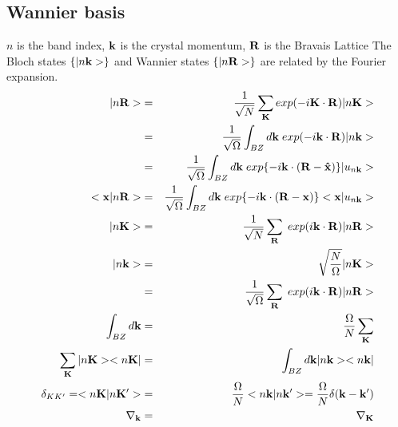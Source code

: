 \documentclass[aps,prb,preprint]{revtex4-1}
\begin{document}
\begin{appendix}

\section{Wannier basis}
$n$ is the band index, $\bf k$ is the crystal momentum, ${\bf R} $ is the Bravais Lattice
The Bloch states $\{ |n{\bf k}> \}$ and Wannier states $\{ |n{\bf R}> \}$ are related by the Fourier expansion. 
\begin{eqnarray}
|n{\bf R}> &=&\frac{1}{\sqrt{N}} \sum_{\bf K} exp(-i{\bf K} \cdot {\bf R})|n{\bf K}> \nonumber\\
&=&\frac{1}{\sqrt{\Omega}} \int_{BZ} d{\bf k} \; exp(-i{\bf k} \cdot {\bf R})|n{\bf k}> \nonumber\\
&=&\frac{1}{\sqrt{\Omega}} \int_{BZ} d{\bf k} \; exp\{-i{\bf k} \cdot ({\bf R- \hat{x}})\}|u_{n{\bf k}}>\\
<{\bf x}|n{\bf R}>&=& \frac{1}{\sqrt{\Omega}} \int_{BZ} d{\bf k} \; exp\{-i{\bf k} \cdot ({\bf R- x})\}<{\bf x}|u_{n{\bf k}}> \\
|n{\bf K}>&=& \frac{1}{\sqrt{N}} \sum_{\bf R} \; exp(i{\bf k} \cdot {\bf R}) |n{\bf R}> \\
|n{\bf k}>&=&  \sqrt{\frac{N}{\Omega}} |n{\bf K}> \nonumber \\
&=& \frac{1}{\sqrt{\Omega}} \sum_{\bf R} \; exp(i{\bf k} \cdot {\bf R}) |n{\bf R}> \\
 \int_{BZ} d{\bf k} &=& \frac{\Omega}{N} \sum_{\bf K}\\
\sum_{\bf K} |n{\bf K}><n{\bf K}| &=& \int_{BZ} d{\bf k} |n{\bf k}><n{\bf k}|\\
 \delta_{KK'} =<n{\bf K}|n{\bf K'}> &=& \frac{\Omega}{N} <n{\bf k}|n{\bf k'}> = \frac{\Omega}{N} \delta({\bf k-k'})\\
 \nabla_{\bf k} &=& \nabla_{\bf K}
 \end{eqnarray} 


\end{appendix}
\end{document}
